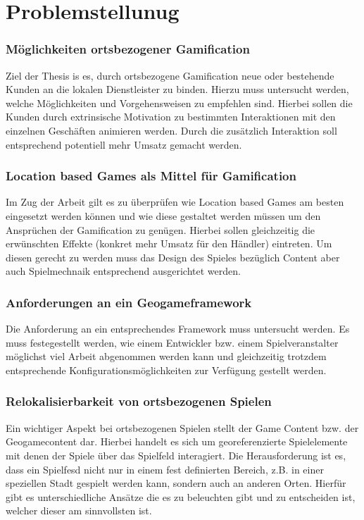 \chapter{Problemstellunug}
\label{ch2:Problemstellunug}

\subsection*{Möglichkeiten ortsbezogener Gamification}

Ziel der Thesis is es, durch ortsbezogene Gamification neue oder bestehende Kunden an die lokalen Dienstleister zu binden.
Hierzu muss untersucht werden, welche Möglichkeiten und Vorgehensweisen zu empfehlen sind.
Hierbei sollen die Kunden durch extrinsische Motivation zu bestimmten Interaktionen mit den einzelnen Geschäften animieren werden.
Durch die zusätzlich Interaktion soll entsprechend potentiell mehr Umsatz gemacht werden.

\subsection*{Location based Games als Mittel für Gamification}

Im Zug der Arbeit gilt es zu überprüfen wie Location based Games am besten eingesetzt werden können und wie diese gestaltet werden müssen um den Ansprüchen der Gamification zu genügen. Hierbei sollen gleichzeitig die erwünschten Effekte (konkret mehr Umsatz für den Händler) eintreten. Um diesen gerecht zu werden muss das Design des Spieles bezüglich Content aber auch Spielmechnaik entsprechend ausgerichtet werden.

\subsection*{Anforderungen an ein Geogameframework}

Die Anforderung an ein entsprechendes Framework muss untersucht werden. Es muss festegestellt werden, wie einem Entwickler bzw. einem Spielveranstalter möglichst viel Arbeit abgenommen werden kann und gleichzeitig trotzdem entsprechende Konfigurationsmöglichkeiten zur Verfügung gestellt werden.

\subsection*{Relokalisierbarkeit von ortsbezogenen Spielen}

Ein wichtiger Aspekt bei ortsbezogenen Spielen stellt der Game Content bzw. der Geogamecontent dar. Hierbei handelt es sich um georeferenzierte Spielelemente mit denen der Spiele über das Spielfeld interagiert. Die Herausforderung ist es, dass ein Spielfesd nicht nur in einem fest definierten Bereich, z.B. in einer speziellen Stadt gespielt werden kann, sondern auch an anderen Orten. Hierfür gibt es unterschiedliche Ansätze die es zu beleuchten gibt und zu entscheiden ist, welcher dieser am sinnvollsten ist.

